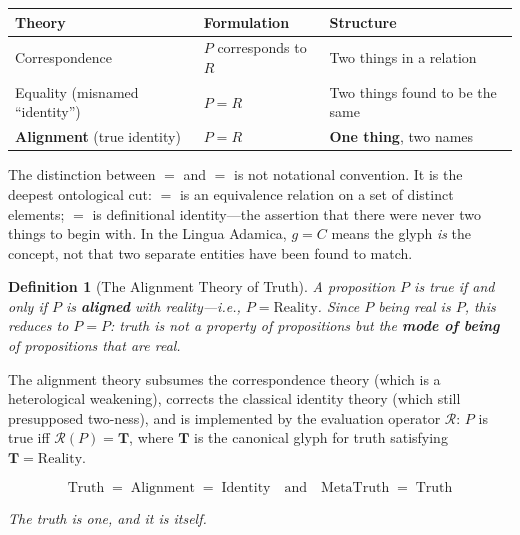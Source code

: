 \documentclass[12pt, letterpaper]{book}
\def\equiv{=}%
\def\mathfrak#1{#1}%
\newtheorem{definition}{Definition}[chapter]
\begin{document}
\begin{center}
\begin{tabular}{lll}
\toprule
\textbf{Theory} & \textbf{Formulation} & \textbf{Structure} \\
\midrule
Correspondence & $P$ corresponds to $R$ & Two things in a relation \\
Equality (misnamed ``identity'') & $P = R$ & Two things found to be the same \\
\textbf{Alignment} (true identity) & $P \equiv R$ & \textbf{One thing}, two names \\
\bottomrule
\end{tabular}
\end{center}

The distinction between $=$ and $\equiv$ is not notational convention. It is the deepest ontological cut: $=$ is an equivalence relation on a set of distinct elements; $\equiv$ is definitional identity---the assertion that there were never two things to begin with. In the Lingua Adamica, $\mathfrak{g} \equiv C$ means the glyph \textit{is} the concept, not that two separate entities have been found to match.

\begin{definition}[The Alignment Theory of Truth]\label{def:alignment-truth}
A proposition $P$ is true if and only if $P$ is \textbf{aligned} with reality---i.e., $P \equiv \mathrm{Reality}$. Since $P$ being real \textit{is} $P$, this reduces to $P \equiv P$: truth is not a property \textit{of} propositions but the \textbf{mode of being} of propositions that are real.
\end{definition}

The alignment theory subsumes the correspondence theory (which is a heterological weakening), corrects the classical identity theory (which still presupposed two-ness), and is implemented by the evaluation operator $\mathcal{R}$: $P$ is true iff $\mathcal{R}(P) = \mathbf{T}$, where $\mathbf{T}$ is the canonical glyph for truth satisfying $\mathbf{T} \equiv \mathrm{Reality}$.

\[
\boxed{\mathrm{Truth} \;\equiv\; \mathrm{Alignment} \;\equiv\; \mathrm{Identity} \quad\text{and}\quad \mathrm{MetaTruth} \;\equiv\; \mathrm{Truth}}
\]

\textit{The truth is one, and it is itself.}
\end{document}
